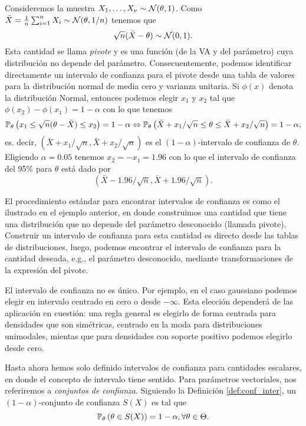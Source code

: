 \begin{example}
	Consideremos la muestra $X_1,\ldots,X_\nu\sim{\mathcal N}(\theta,1)$. Como $\bar{X}=\frac{1}{n}\sum_{i=1}^nX_i\sim{\mathcal N}(\theta,1/n)$ tenemos que  
	\begin{equation}
			\sqrt{n}(\bar{X}-\theta)\sim{\mathcal N}(0,1).
		\end{equation}	
	Esta cantidad se llama \emph{pivote} y es una función (de la VA y del parámetro) cuya distribución no depende del parámetro. Consecuentemente, podemos identificar directamente un intervalo de confianza para el pivote desde una tabla de valores para la distribución normal de media cero y varianza unitaria. Si $\phi(x)$ denota la distribución Normal, entonces podemos elegir  $x_1$ y $x_2$ tal que $\phi(x_2)-\phi(x_1) = 1-\alpha$ con lo que tenemos
	\begin{equation}
	 	\mathbb{P}_\theta \left(x_1 \leq \sqrt{n}(\theta-\bar{X}) \leq x_2\right) = 1-\alpha \Leftrightarrow \mathbb{P}_\theta \left(\bar{X} + x_1/\sqrt{n} \leq \theta \leq \bar{X} + x_2/\sqrt{n}\right) = 1-\alpha,
	 \end{equation} 
	 es. decir, $(\bar{X} + x_1/\sqrt{n},\bar{X} + x_2/\sqrt{n})$ es el $(1-\alpha)$-intervalo de confianza de $\theta$. Eligiendo $\alpha=0.05$ tenemos $x_2 = -x_1 =1.96$ con lo que el intervalo de confianza del 95\% para $\theta$ está dado por 
	 \begin{equation}
	 	(\bar{X} -1.96/\sqrt{n},\bar{X} + 1.96/\sqrt{n}).
	 \end{equation}

	 El procedimiento estándar para encontrar intervalos de confianza es como el ilustrado en el ejemplo anterior, en donde construimos una cantidad que tiene una distribución que no depende del parámetro desconocido (llamada pivote). Construir un intervalo de confianza para esta cantidad es directo desde las tablas de distribuciones, luego, podemos encontrar el intervalo de confianza para la cantidad deseada, e.g., el parámetro desconocido, mediante transformaciones de la expresión del pivote. 

	 \begin{remark}
	 	El intervalo de confianza no es único. Por ejemplo, en el caso gaussiano podemos elegir en intervalo centrado en cero o desde $-\infty$. Esta elección dependerá de las aplicación en cuestión: una regla general es elegirlo de forma centrada para densidades que son simétricas, centrado en la moda para distribuciones unimodales, mientas que para densidades con soporte positivo podemos elegirlo desde cero. 
	 \end{remark}

	 Hasta ahora hemos solo definido intervalos de confianza para cantidades escalares, en donde el concepto de intervalo tiene sentido. Para parámetros vectoriales, nos referiremos a  \textit{conjuntos de confianza}. Siguiendo la Definición \ref{def:conf_inter}, un $(1-\alpha)$-conjunto de confianza $S(X)$ es tal que 
	 \begin{equation}
	\label{eq:conf_set}
	\mathbb{P}_\theta \left(\theta\in S(X)\right) = 1-\alpha, \forall \theta\in\Theta.
\end{equation}
\end{example}


